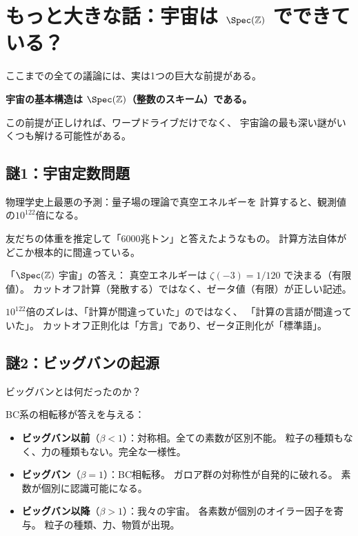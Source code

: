 \documentclass[12pt,a4paper]{article}
\begin{document}
\section{もっと大きな話：宇宙は $\Spec(\mathbb{Z})$ でできている？}
\label{sec:cosmology}

ここまでの全ての議論には、実は1つの巨大な前提がある。

\begin{keybox}[隠れた大前提]
\textbf{宇宙の基本構造は $\Spec(\mathbb{Z})$（整数のスキーム）である。}

この前提が正しければ、ワープドライブだけでなく、
宇宙論の最も深い謎がいくつも解ける可能性がある。
\end{keybox}

\subsection{謎1：宇宙定数問題}

物理学史上最悪の予測：量子場の理論で真空エネルギーを
計算すると、観測値の$10^{122}$倍になる。

\begin{analogybox}
友だちの体重を推定して「6000兆トン」と答えたようなもの。
計算方法自体がどこか根本的に間違っている。
\end{analogybox}

「$\Spec(\mathbb{Z})$ 宇宙」の答え：
真空エネルギーは $\zeta(-3) = 1/120$ で決まる（有限値）。
カットオフ計算（発散する）ではなく、ゼータ値（有限）が正しい記述。

$10^{122}$倍のズレは、「計算が間違っていた」のではなく、
「計算の言語が間違っていた」。
カットオフ正則化は「方言」であり、ゼータ正則化が「標準語」。

\subsection{謎2：ビッグバンの起源}

ビッグバンとは何だったのか？

BC系の相転移が答えを与える：
\begin{itemize}
\item \textbf{ビッグバン以前}（$\beta < 1$）：対称相。全ての素数が区別不能。
  粒子の種類もなく、力の種類もない。完全な一様性。
\item \textbf{ビッグバン}（$\beta = 1$）：BC相転移。
  ガロア群の対称性が自発的に破れる。
  素数が個別に認識可能になる。
\item \textbf{ビッグバン以降}（$\beta > 1$）：我々の宇宙。
  各素数が個別のオイラー因子を寄与。
  粒子の種類、力、物質が出現。
\end{itemize}
\end{document}
